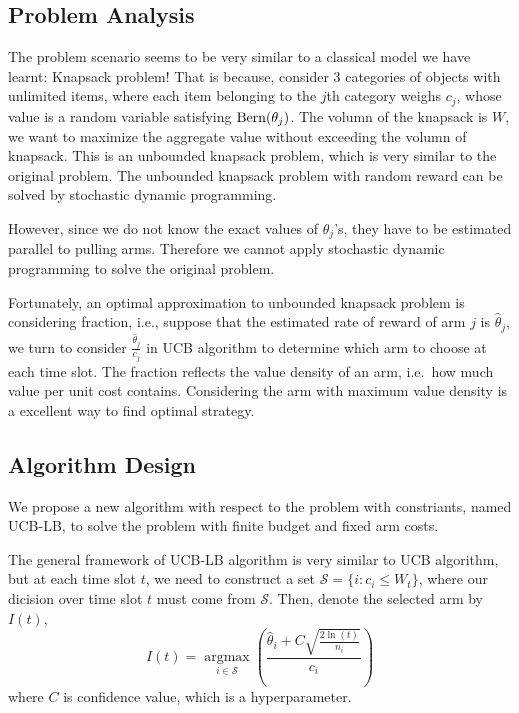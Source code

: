 \documentclass[11pt]{article}
\begin{document}
\hypertarget{problem-analysis}{%
\subsection{Problem Analysis}\label{problem-analysis}}

The problem scenario seems to be very similar to a classical model we
have learnt: Knapsack problem! That is because, consider 3 categories of
objects with unlimited items, where each item belonging to the \(j\)th
category weighs \(c_j\), whose value is a random variable satisfying
\({\rm Bern}(\theta_j)\). The volumn of the knapsack is \(W\), we want
to maximize the aggregate value without exceeding the volumn of
knapsack. This is an unbounded knapsack problem, which is very similar
to the original problem. The unbounded knapsack problem with random
reward can be solved by stochastic dynamic programming.

However, since we do not know the exact values of \(\theta_j\)'s, they
have to be estimated parallel to pulling arms. Therefore we cannot apply
stochastic dynamic programming to solve the original problem.

Fortunately, an optimal approximation to unbounded knapsack problem is
considering fraction, i.e., suppose that the estimated rate of reward of
arm \(j\) is \(\hat{\theta}_j\), we turn to consider
\(\frac{\hat{\theta}_j}{c_j}\) in UCB algorithm to determine which arm
to choose at each time slot. The fraction reflects the value density of
an arm, i.e.~how much value per unit cost contains. Considering the arm
with maximum value density is a excellent way to find optimal strategy.

\hypertarget{algorithm-design}{%
\subsection{Algorithm Design}\label{algorithm-design}}

We propose a new algorithm with respect to the problem with constriants,
named UCB-LB, to solve the problem with finite budget and fixed arm
costs.

The general framework of UCB-LB algorithm is very similar to UCB
algorithm, but at each time slot \(t\), we need to construct a set
\(\mathcal{S}=\{i:c_i\leqslant W_t\}\), where our dicision over time
slot \(t\) must come from \(\mathcal{S}\). Then, denote the selected arm
by \(I(t)\), \[
I(t)=\mathop{\arg\max}\limits_{i\in\mathcal{S}}\left(\frac{\hat{\theta}_i+C\sqrt{\frac{2\ln(t)}{n_i}}}{c_i}\right)
\] where \(C\) is confidence value, which is a hyperparameter.
\end{document}
